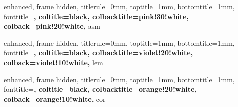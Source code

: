 
{
    enhanced,
    frame hidden,
    titlerule=0mm,
    toptitle=1mm,
    bottomtitle=1mm,
    fonttitle=\bfseries\large,
    coltitle=black,
    colbacktitle=pink!30!white,
    colback=pink!20!white,
}{asm}


{
    enhanced,
    frame hidden,
    titlerule=0mm,
    toptitle=1mm,
    bottomtitle=1mm,
    fonttitle=\bfseries\large,
    coltitle=black,
    colbacktitle=violet!20!white,
    colback=violet!10!white,
}{lem}


\newenvironment{lempf}{
	{\noindent{\it \textbf{Proof for Lemma}}}
	\tcolorbox[blanker,breakable,left=5mm,parbox=false,
    before upper={\parindent15pt},
    after skip=10pt,
	borderline west={1mm}{0pt}{violet!20!white}]
}{
    \textcolor{violet!20!white}{\hbox{}\nobreak\hfill$\blacksquare$} 
    \endtcolorbox
}

\NewDocumentCommand{\lemp}{m+m+m}{
    \begin{mylemma}{#1}{}
        #2
    \end{mylemma}

    \begin{lempf}
        #3
    \end{lempf}
}

{
    enhanced,
    frame hidden,
    titlerule=0mm,
    toptitle=1mm,
    bottomtitle=1mm,
    fonttitle=\bfseries\large,
    coltitle=black,
    colbacktitle=orange!20!white,
    colback=orange!10!white,
}{cor}


\newenvironment{corpf}{
	{\noindent{\it \textbf{Proof for Corollary.}}}
	\tcolorbox[blanker,breakable,left=5mm,parbox=false,
    before upper={\parindent15pt},
    after skip=10pt,
	borderline west={1mm}{0pt}{orange!20!white}]
}{
    \textcolor{orange!20!white}{\hbox{}\nobreak\hfill$\blacksquare$} 
    \endtcolorbox
}

